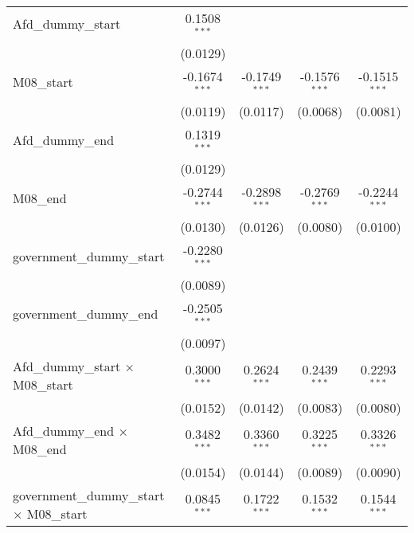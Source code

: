 \documentclass[10pt,a4paper]{article}
\begin{document}
\begin{tabular}{lcccc}
   Afd\_dummy\_start                                & 0.1508$^{***}$  &                 &                 &   \\   
                                                    & (0.0129)        &                 &                 &   \\   
   M08\_start                                       & -0.1674$^{***}$ & -0.1749$^{***}$ & -0.1576$^{***}$ & -0.1515$^{***}$\\   
                                                    & (0.0119)        & (0.0117)        & (0.0068)        & (0.0081)\\   
   Afd\_dummy\_end                                  & 0.1319$^{***}$  &                 &                 &   \\   
                                                    & (0.0129)        &                 &                 &   \\   
   M08\_end                                         & -0.2744$^{***}$ & -0.2898$^{***}$ & -0.2769$^{***}$ & -0.2244$^{***}$\\   
                                                    & (0.0130)        & (0.0126)        & (0.0080)        & (0.0100)\\   
   government\_dummy\_start                         & -0.2280$^{***}$ &                 &                 &   \\   
                                                    & (0.0089)        &                 &                 &   \\   
   government\_dummy\_end                           & -0.2505$^{***}$ &                 &                 &   \\   
                                                    & (0.0097)        &                 &                 &   \\   
   Afd\_dummy\_start $\times$ M08\_start            & 0.3000$^{***}$  & 0.2624$^{***}$  & 0.2439$^{***}$  & 0.2293$^{***}$\\   
                                                    & (0.0152)        & (0.0142)        & (0.0083)        & (0.0080)\\   
   Afd\_dummy\_end $\times$ M08\_end                & 0.3482$^{***}$  & 0.3360$^{***}$  & 0.3225$^{***}$  & 0.3326$^{***}$\\   
                                                    & (0.0154)        & (0.0144)        & (0.0089)        & (0.0090)\\   
   government\_dummy\_start $\times$ M08\_start     & 0.0845$^{***}$  & 0.1722$^{***}$  & 0.1532$^{***}$  & 0.1544$^{***}$\\   

\end{tabular}
\end{document}
